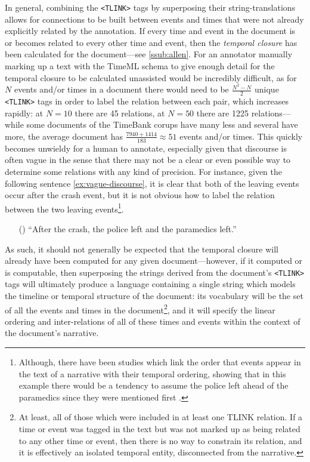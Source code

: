 \documentclass[a4paper,12pt,leqno]{article}
\newcommand{\ipp}{(\refstepcounter{equation}\theequation)}
\begin{document}
In general, combining the \verb|<TLINK>| tags by superposing their string-translations allows for connections to be built between events and times that were not already explicitly related by the annotation. If every time and event in the document is or becomes related to every other time and event, then the \textit{temporal closure} has been calculated for the document---see \cref{ssub:allen}. For an annotator manually marking up a text with the TimeML schema to give enough detail for the temporal closure to be calculated unassisted would be incredibly difficult, as for $N$ events and/or times in a document there would need to be $\frac{N^2 - N}{2}$ unique \verb|<TLINK>| tags in order to label the relation between each pair, which increases rapidly: at $N = 10$ there are 45 relations, at $N = 50$ there are 1225 relations---while some documents of the TimeBank corups have many less and several have more, the average document has $\frac{7940+1414}{183} \approx 51$ events and/or times. This quickly becomes unwieldy for a human to annotate, especially given that discourse is often vague in the sense that there may not be a clear or even possible way to determine some relations with any kind of precision. For instance, given the following sentence \cref{ex:vague-discourse}, it is clear that both of the leaving events occur after the crash event, but it is not obvious how to label the relation between the two leaving events\footnote{Although, there have been studies which link the order that events appear in the text of a narrative with their temporal ordering, showing that in this example there would be a tendency to assume the police left ahead of the paramedics since they were mentioned first \citep{ohtsuka1992discourse}.}.
\begin{itemize}
	\item[\ipp\label{ex:vague-discourse}] ``After the crash, the police left and the paramedics left.''
\end{itemize}
As such, it should not generally be expected that the temporal closure will already have been computed for any given document---however, if it computed or is computable, then superposing the strings derived from the document's \verb|<TLINK>| tags will ultimately produce a language containing a single string which models the timeline or temporal structure of the document: its vocabulary will be the set of all the events and times in the document\footnote{At least, all of those which were included in at least one TLINK relation. If a time or event was tagged in the text but was not marked up as being related to any other time or event, then there is no way to constrain its relation, and it is effectively an isolated temporal entity, disconnected from the narrative.}, and it will specify the linear ordering and inter-relations of all of these times and events within the context of the document's narrative.
\end{document}
